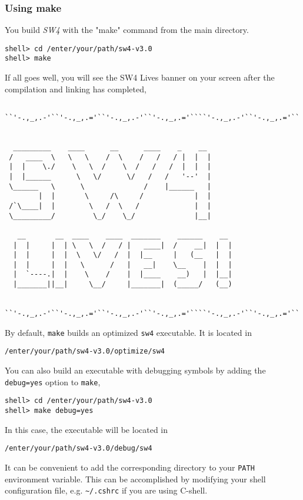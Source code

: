 \documentclass[11pt]{article}
\begin{document}
\subsubsection{Using make}
You build \emph{SW4} with the "make" command from the main directory.
\begin{verbatim}
shell> cd /enter/your/path/sw4-v3.0
shell> make
\end{verbatim}
If all goes well, you will see the SW4 Lives banner on your screen after the compilation and linking
has completed,
{\samepage
\begin{verbatim}
    
``'-.,_,.-'``'-.,_,.='``'-.,_,.-'``'-.,_,.='````'-.,_,.-'``'-.,_,.='``


  _________    ____      __      ____    _    __
 /   ____  \   \   \    /  \    /   /   / |  |  |  
 |  |    \./    \   \  /    \  /   /   /  |  |  |
 |  |______      \   \/      \/   /   /   '--'  |
 \______   \      \              /    |______   |
        |  |       \     /\     /            |  |      
 /`\____|  |        \   /  \   /             |  |      
 \_________/         \_/    \_/              |__|      
                                       
   __       __  ____    ____  _______    ______    __  
  |  |     |  | \   \  /   / |   ____|  /    __|  |  | 
  |  |     |  |  \   \/   /  |  |__     |   (__   |  | 
  |  |     |  |   \      /   |   __|    \__    |  |  | 
  |  `----.|  |    \    /    |  |____    __)   |  |__| 
  |_______||__|     \__/     |_______|  (_____/   (__)
     

``'-.,_,.-'``'-.,_,.='``'-.,_,.-'``'-.,_,.='````'-.,_,.-'``'-.,_,.='``

\end{verbatim}
}
By default, \verb+make+ builds an optimized \verb+sw4+ executable. It is located in 
\begin{verbatim}
/enter/your/path/sw4-v3.0/optimize/sw4
\end{verbatim}
You can also build an executable with debugging symbols by adding the \verb+debug=yes+ option to \verb+make+,
\begin{verbatim}
shell> cd /enter/your/path/sw4-v3.0
shell> make debug=yes
\end{verbatim}
In this case, the executable will be located in
\begin{verbatim}
/enter/your/path/sw4-v3.0/debug/sw4
\end{verbatim}
It can be convenient to add the corresponding directory to your \verb+PATH+ environment
variable. This can be accomplished by modifying your shell configuration file, e.g. \verb+~/.cshrc+
if you are using C-shell.
\end{document}

